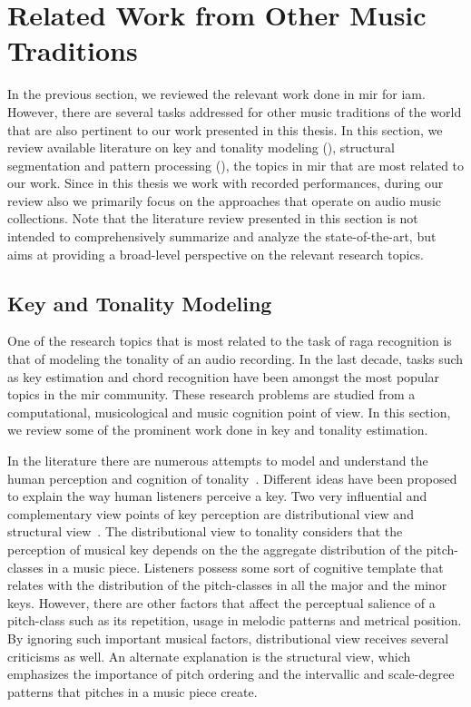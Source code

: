 \section{Related Work from Other Music Traditions}
\label{sec:background_relevant_work_other_music}

In the previous section, we reviewed the relevant work done in \gls{mir} for \gls{iam}. However, there are several tasks addressed for other music traditions of the world that are also pertinent to our work presented in this thesis. In this section, we review available literature on key and tonality modeling (), structural segmentation and pattern processing (), the topics in \gls{mir} that are most related to our work. Since in this thesis we work with recorded performances, during our review also we primarily focus on the approaches that operate on audio music collections. Note that the literature review presented in this section is not intended to comprehensively summarize and analyze the state-of-the-art, but aims at providing a broad-level perspective on the relevant research topics.

\subsection{Key and Tonality Modeling}
\label{sec:background_key_and_tonality_modeling}

One of the research topics that is most related to the task of \gls{raga} recognition is that of modeling the tonality of an audio recording. In the last decade, tasks such as key estimation and chord recognition have been amongst the most popular topics in the \gls{mir} community. These research problems are studied from a computational, musicological and music cognition point of view. In this section, we review some of the prominent work done in key and tonality estimation. 

In the literature there are numerous attempts to model and understand the human perception and cognition of tonality~\citep{longuet1971interpreting,krumhansl1979quantification,chew2000towards,krumhansl2000tonality,cohen1991tonality}. Different ideas have been proposed to explain the way human listeners perceive a key. Two very influential and complementary view points of key perception are distributional view and structural view~\citep{Brown1988,temperley2008pitch}. The distributional view to tonality considers that the perception of musical key depends on the the aggregate distribution of the pitch-classes in a music piece. Listeners possess some sort of cognitive template that relates with the distribution of the pitch-classes in all the major and the minor keys. However, there are other factors that affect the perceptual salience of a pitch-class such as its repetition, usage in melodic patterns and metrical position. By ignoring such important musical factors, distributional view receives several criticisms as well. An alternate explanation is the structural view, which emphasizes the importance of pitch ordering and the intervallic and scale-degree patterns that pitches in a music piece create.

